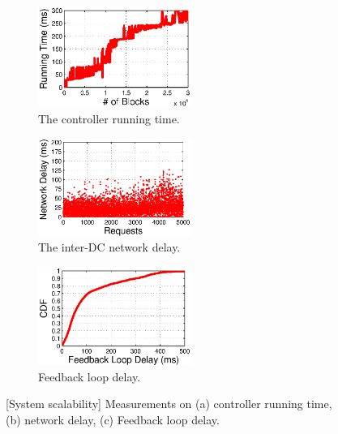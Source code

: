 \begin{figure}[t]
        \centering
        \begin{subfigure}[b]{0.3\textwidth}
                \centering
                \includegraphics[width=50mm]{images/CPUvsBlk.eps}%
                \caption{The controller running time.}
                \label{fig:scale:cpu}
        \end{subfigure}
        \begin{subfigure}[b]{0.3\textwidth}
                \centering
                \includegraphics[width=50mm]{images/NetworkDelay.eps}%
                \caption{The inter-DC network delay.}
                \label{fig:scale:network}
        \end{subfigure}
        \begin{subfigure}[b]{0.3\textwidth}
                \centering
                \includegraphics[width=50mm]{images/CDFofFeedbackLoopDelay.eps}
                \caption{Feedback loop delay.}
                \label{fig:scale:feedback}
        \end{subfigure}
        \caption{[System scalability] Measurements on (a) controller running time, (b) network delay, (c) Feedback loop delay.}
        \label{fig:scale}
\vspace{-0.4cm}
\end{figure}

